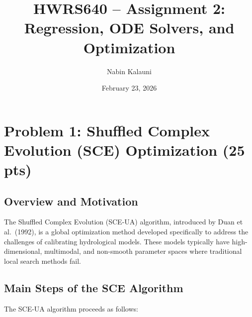 \documentclass[11pt,letterpaper]{article}
\title{\textbf{HWRS640 -- Assignment 2:\\Regression, ODE Solvers, and Optimization}}
\author{Nabin Kalauni}
\date{February 23, 2026}
\begin{document}
\maketitle

\section{Problem 1: Shuffled Complex Evolution (SCE) Optimization (25 pts)}

\subsection{Overview and Motivation}

The Shuffled Complex Evolution (SCE-UA) algorithm, introduced by Duan et al.\ (1992), is a global optimization method developed specifically to address the challenges of calibrating hydrological models. These models typically have high-dimensional, multimodal, and non-smooth parameter spaces where traditional local search methods fail.

\subsection{Main Steps of the SCE Algorithm}

The SCE-UA algorithm proceeds as follows:
\end{document}

